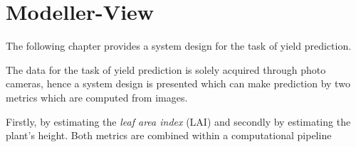 \section{Modeller-View}

The following chapter provides a system design for the task of yield prediction.

The data for the task of yield prediction is solely acquired through photo cameras, hence a system design is
presented which can make prediction by two metrics which are computed from images.

Firstly, by estimating the \textit{leaf area index} (LAI) and secondly by estimating the plant's height.
Both metrics are combined within a computational pipeline